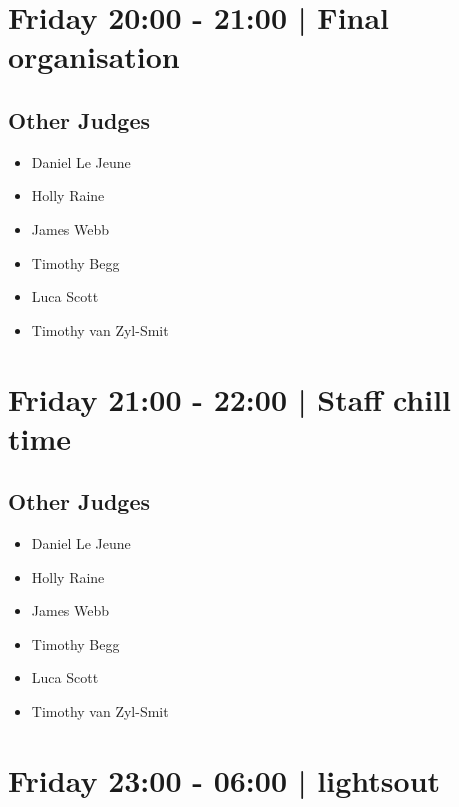 \documentclass[10pt, A5]{article}
\begin{document}
            \section*{Friday 20:00
        -
        21:00
        |
         Final organisation}
        
                
        \subsection*{Other Judges}
        
            \begin{itemize}
                            \item Daniel Le Jeune
                            \item Holly Raine
                            \item James Webb
                            \item Timothy Begg
                            \item Luca Scott
                            \item Timothy van Zyl-Smit
                        \end{itemize}
        

            \section*{Friday 21:00
        -
        22:00
        |
         Staff chill time}
        
                
        \subsection*{Other Judges}
        
            \begin{itemize}
                            \item Daniel Le Jeune
                            \item Holly Raine
                            \item James Webb
                            \item Timothy Begg
                            \item Luca Scott
                            \item Timothy van Zyl-Smit
                        \end{itemize}
        

            \section*{Friday 23:00
        -
        06:00
        |
         lightsout}
        
\end{document}

